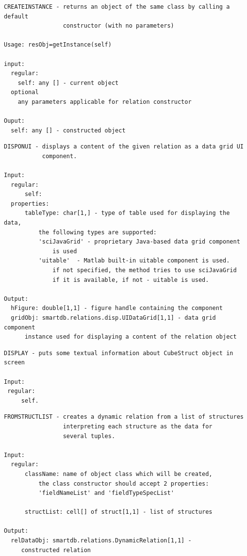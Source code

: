 \documentclass[letterpaper,10pt,english]{sphinxmanual}
\begin{document}
\begin{Verbatim}[commandchars=\\\{\}]
CREATEINSTANCE - returns an object of the same class by calling a default
                 constructor (with no parameters)

Usage: resObj=getInstance(self)

input:
  regular:
    self: any [] - current object
  optional
    any parameters applicable for relation constructor

Ouput:
  self: any [] - constructed object
\end{Verbatim}

\begin{Verbatim}[commandchars=\\\{\}]
DISPONUI - displays a content of the given relation as a data grid UI
           component.

Input:
  regular:
      self:
  properties:
      tableType: char[1,] - type of table used for displaying the data,
          the following types are supported:
          'sciJavaGrid' - proprietary Java-based data grid component
              is used
          'uitable'  - Matlab built-in uitable component is used.
              if not specified, the method tries to use sciJavaGrid
              if it is available, if not - uitable is used.

Output:
  hFigure: double[1,1] - figure handle containing the component
  gridObj: smartdb.relations.disp.UIDataGrid[1,1] - data grid component
      instance used for displaying a content of the relation object
\end{Verbatim}

\begin{Verbatim}[commandchars=\\\{\}]
DISPLAY - puts some textual information about CubeStruct object in screen

Input:
 regular:
     self.
\end{Verbatim}

\begin{Verbatim}[commandchars=\\\{\}]
FROMSTRUCTLIST - creates a dynamic relation from a list of structures
                 interpreting each structure as the data for
                 several tuples.

Input:
  regular:
      className: name of object class which will be created,
          the class constructor should accept 2 properties:
          'fieldNameList' and 'fieldTypeSpecList'

      structList: cell[] of struct[1,1] - list of structures

Output:
  relDataObj: smartdb.relations.DynamicRelation[1,1] -
     constructed relation
\end{Verbatim}
\end{document}
